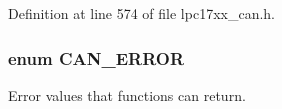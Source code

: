 \-Definition at line 574 of file lpc17xx\-\_\-can.\-h.

\hypertarget{group___c_a_n___public___types_ga1d9859e6b360c9448574f86ea199a112}{
\subsubsection[{\-C\-A\-N\-\_\-\-E\-R\-R\-O\-R}]{\setlength{\rightskip}{0pt plus 5cm}enum {\bf \-C\-A\-N\-\_\-\-E\-R\-R\-O\-R}}}\label{group___c_a_n___public___types_ga1d9859e6b360c9448574f86ea199a112}


\-Error values that functions can return. 


